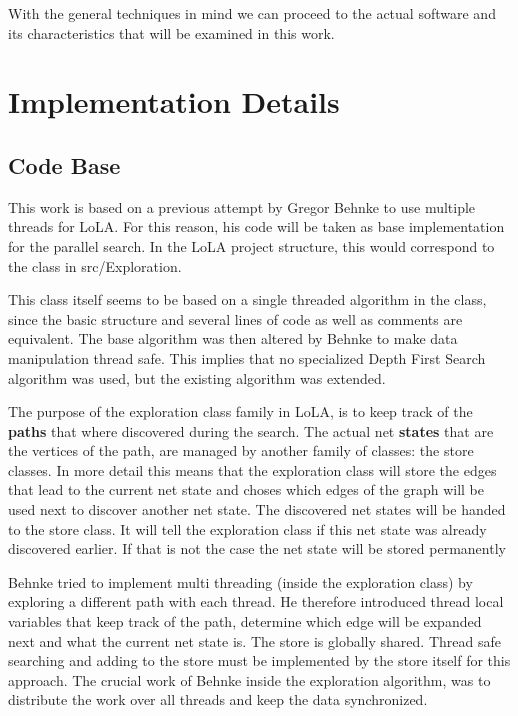 With the general techniques in mind we can proceed to the actual software and its characteristics that will be examined in this work.

\section{Implementation Details}
\subsection{Code Base}
This work is based on a previous attempt by Gregor Behnke to use multiple threads for LoLA. For this reason, his code will be taken as base implementation for the parallel search. In the LoLA project structure, this would correspond to the  class in src/Exploration.

This class itself seems to be based on a single threaded algorithm in the  class, since the basic structure and several lines of code as well as comments are equivalent. The base algorithm was then altered by Behnke to make data manipulation thread safe. This implies that no specialized Depth First Search algorithm was used, but the existing algorithm was extended.

The purpose of the exploration class family in LoLA, is to keep track of the \textbf{paths} that where discovered during the search. The actual net \textbf{states} that are the vertices of the path, are managed by another family of classes: the store classes. In more detail this means that the exploration class will store the edges that lead to the current net state and choses which edges of the graph will be used next to discover another net state. The discovered net states will be handed to the store class. It will tell the exploration class if this net state was already discovered earlier. If that is not the case the net state will be stored permanently

Behnke tried to implement multi threading (inside the exploration class) by exploring a different path with each thread. He therefore introduced thread local variables that keep track of the path, determine which edge will be expanded next and what the current net state is. The store is globally shared. Thread safe searching and adding to the store must be implemented by the store itself for this approach. The crucial work of Behnke inside the exploration algorithm, was to distribute the work over all threads and keep the data synchronized.

